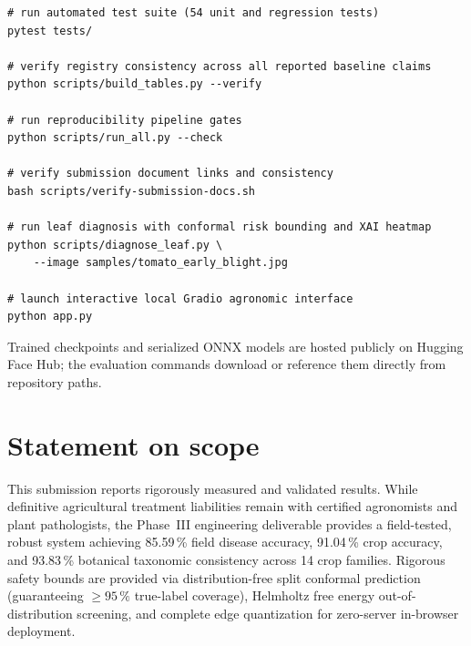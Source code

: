 \documentclass[12pt,a4paper]{report}
\begin{document}
\begin{verbatim}
# run automated test suite (54 unit and regression tests)
pytest tests/

# verify registry consistency across all reported baseline claims
python scripts/build_tables.py --verify

# run reproducibility pipeline gates
python scripts/run_all.py --check

# verify submission document links and consistency
bash scripts/verify-submission-docs.sh

# run leaf diagnosis with conformal risk bounding and XAI heatmap
python scripts/diagnose_leaf.py \
    --image samples/tomato_early_blight.jpg

# launch interactive local Gradio agronomic interface
python app.py
\end{verbatim}

Trained checkpoints and serialized ONNX models are hosted publicly on Hugging Face
Hub; the evaluation commands download or reference them directly from repository paths.

\section{Statement on scope}

This submission reports rigorously measured and validated results. While definitive
agricultural treatment liabilities remain with certified agronomists and plant pathologists,
the Phase~III engineering deliverable provides a field-tested, robust system achieving
85.59\,\% field disease accuracy, 91.04\,\% crop accuracy, and 93.83\,\% botanical taxonomic
consistency across 14 crop families. Rigorous safety bounds are provided via distribution-free
split conformal prediction (guaranteeing $\ge 95\,\%$ true-label coverage), Helmholtz free energy
out-of-distribution screening, and complete edge quantization for zero-server in-browser deployment.

\end{document}
